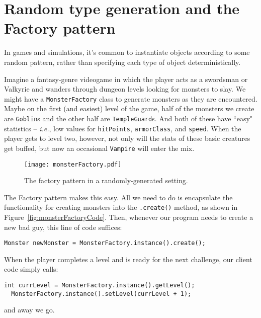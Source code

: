 \section{Random type generation and the Factory pattern}

In games and simulations, it's common to instantiate objects according to some
random pattern, rather than specifying each type of object deterministically.

Imagine a fantasy-genre videogame in which the player acts as a swordsman or
Valkyrie and wanders through dungeon levels looking for monsters to slay. We
might have a \texttt{MonsterFactory} class to generate monsters as they are
encountered. Maybe on the first (and easiest) level of the game, half of the
monsters we create are \texttt{Goblin}s and the other half are
\texttt{TempleGuard}s. And both of these have ``easy" statistics --
\textit{i.e.}, low values for \texttt{hitPoints}, \texttt{armorClass}, and
\texttt{speed}. When the player gets to level two, however, not only will the
stats of these basic creatures get buffed, but now an occasional
\texttt{Vampire} will enter the mix.

\begin{figure}
\centering
\texttt{[image: monsterFactory.pdf]}
\caption{The factory pattern in a randomly-generated setting.}
\label{fig:monsterFactory}
\end{figure}

The Factory pattern makes this easy. All we need to do is encapsulate the
functionality for creating monsters into the \texttt{.create()} method, as
shown in Figure~\ref{fig:monsterFactoryCode}. Then, whenever our program needs
to create a new bad guy, this line of code suffices:

\begin{Verbatim}[fontsize=\small,samepage=true,frame=none]
  Monster newMonster = MonsterFactory.instance().create();
\end{Verbatim}

When the player completes a level and is ready for the next challenge, our
client code simply calls:

\begin{Verbatim}[fontsize=\small,samepage=true,frame=none]
  int currLevel = MonsterFactory.instance().getLevel();
  MonsterFactory.instance().setLevel(currLevel + 1);
\end{Verbatim}

and away we go.

